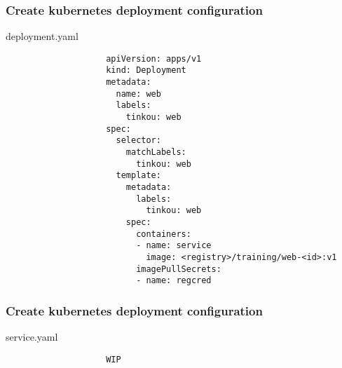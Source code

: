 	\begin{frame}[fragile]
		\frametitle{Create kubernetes deployment configuration}
		\begin{block}{deployment.yaml}
			\begin{tiny}
				\begin{verbatim}
					apiVersion: apps/v1
					kind: Deployment
					metadata:
					  name: web
					  labels:
					    tinkou: web
					spec:
					  selector:
					    matchLabels:
					      tinkou: web
					  template:
					    metadata:
					      labels:
					        tinkou: web
					    spec:
					      containers:
					      - name: service
					        image: <registry>/training/web-<id>:v1
					      imagePullSecrets:
					      - name: regcred
				\end{verbatim}
			\end{tiny}
		\end{block}
	\end{frame}
	
	\begin{frame}[fragile]
		\frametitle{Create kubernetes deployment configuration}

		\begin{block}{service.yaml}
			\begin{small}
				\begin{verbatim}
					WIP
				\end{verbatim}
			\end{small}
		\end{block}
	\end{frame}